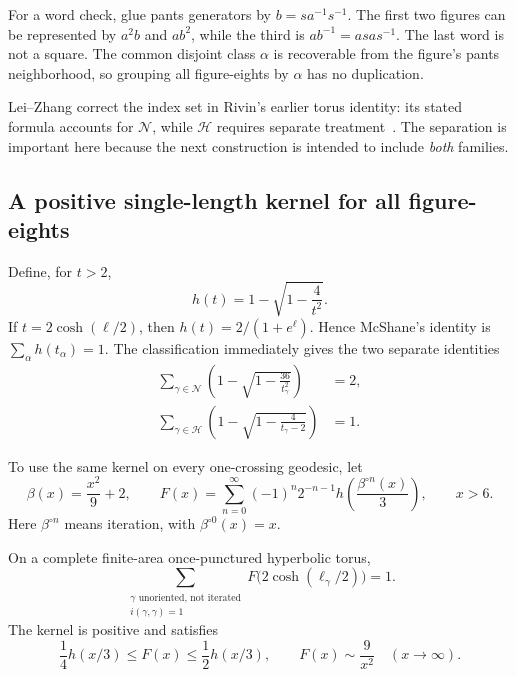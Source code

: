 For a word check, glue pants generators by $b=s a^{-1}s^{-1}$. The first
two figures can be represented by $a^2b$ and $ab^2$, while the third is
$ab^{-1}=asa s^{-1}$. The last word is not a square. The common disjoint
class $\alpha$ is recoverable from the figure's pants neighborhood, so
grouping all figure-eights by $\alpha$ has no duplication.

Lei--Zhang correct the index set in Rivin's earlier torus identity: its
stated formula accounts for $\mathcal N$, while $\mathcal H$ requires
separate treatment~\cite{LeiZhang}. The separation is important here
because the next construction is intended to include \emph{both} families.

\subsection{A positive single-length kernel for all figure-eights}

Define, for $t>2$,
\begin{equation}
 h(t)=1-\sqrt{1-\frac4{t^2}}.
 \label{eq:htrace}
\end{equation}
If $t=2\cosh(\ell/2)$, then $h(t)=2/(1+e^\ell)$. Hence McShane's
identity is $\sum_\alpha h(t_\alpha)=1$. The classification immediately
gives the two separate identities
\begin{align}
 \sum_{\gamma\in\mathcal N}
       \left(1-\sqrt{1-\frac{36}{t_\gamma^2}}\right)&=2,
       \label{eq:nidentity}\\
 \sum_{\gamma\in\mathcal H}
       \left(1-\sqrt{1-\frac4{t_\gamma-2}}\right)&=1.
       \label{eq:hidentity}
\end{align}

To use the same kernel on every one-crossing geodesic, let
\begin{equation}
 \beta(x)=\frac{x^2}{9}+2,\qquad
 F(x)=\sum_{n=0}^{\infty}(-1)^n2^{-n-1}
             h\left(\frac{\beta^{\circ n}(x)}3\right),\qquad x>6.
 \label{eq:universalkernel}
\end{equation}
Here $\beta^{\circ n}$ means iteration, with $\beta^{\circ0}(x)=x$.

\begin{proposition}
On a complete finite-area once-punctured hyperbolic torus,
\begin{equation}
 \boxed{\sum_{\substack{\gamma\text{ unoriented, not iterated}\\
                       i(\gamma,\gamma)=1}}
        F\bigl(2\cosh(\ell_\gamma/2)\bigr)=1.}
 \label{eq:allfigureidentity}
\end{equation}
The kernel is positive and satisfies
\begin{equation}
 \frac14h(x/3)\le F(x)\le\frac12h(x/3),
 \qquad F(x)\sim\frac9{x^2}\quad(x\longrightarrow\infty).
 \label{eq:fbound}
\end{equation}
\end{proposition}

